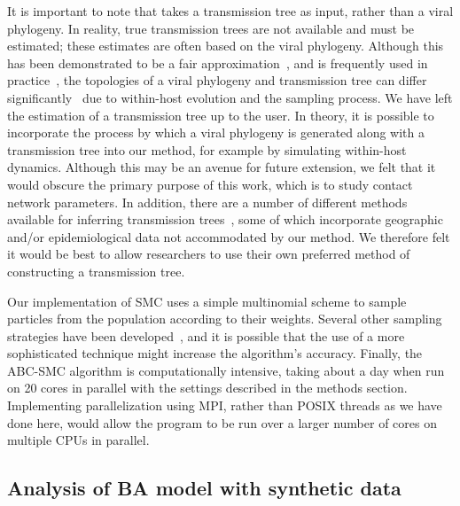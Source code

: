 It is important to note that  takes a transmission tree as
input, rather than a viral phylogeny. In reality, true transmission trees are
not available and must be estimated; these estimates are often based on the
viral phylogeny. Although this has been demonstrated to be a fair
approximation~\autocite[e.g.][]{leitner1996accurate}, and is frequently used in
practice~\autocite[e.g.][]{stadler2013uncovering}, the topologies of a viral
phylogeny and transmission tree can differ
significantly~\autocite{ypma2013relating, hall2015epidemic} due to within-host
evolution and the sampling process. We have left the estimation of a
transmission tree up to the user. In theory, it is possible to incorporate the
process by which a viral phylogeny is generated along with a transmission tree
into our method, for example by simulating within-host dynamics.  Although this may
be an avenue for future extension, we felt that it would obscure the primary
purpose of this work, which is to study contact network parameters. In
addition, there are a number of different methods available for inferring
transmission trees~\autocite{didelot2014bayesian, ypma2012unravelling,
jombart2011reconstructing, cottam2008integrating, hall2015epidemic}, some of
which incorporate geographic and/or epidemiological data not accommodated by
our method. We therefore felt it would be best to allow researchers to use
their own preferred method of constructing a transmission tree.

Our implementation of \gls{SMC} uses a simple multinomial scheme to sample
particles from the population according to their weights. Several other
sampling strategies have been developed~\autocite{douc2005comparison}, and it
is possible that the use of a more sophisticated technique might increase the
algorithm's accuracy. Finally, the \gls{ABC}-\gls{SMC} algorithm is
computationally intensive, taking about a day when run on 20 cores in parallel
with the settings described in the methods section. Implementing
parallelization using \gls{MPI}, rather than \gls{POSIX} threads as we have
done here, would allow the program to be run over a larger number of cores on
multiple CPUs in parallel.

\subsection{Analysis of \acrlong{BA} model with synthetic data}

